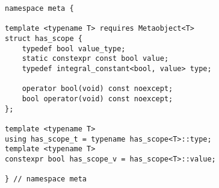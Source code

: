 
\begin{verbatim}
namespace meta {

template <typename T> requires Metaobject<T>
struct has_scope {
	typedef bool value_type;
	static constexpr const bool value;
	typedef integral_constant<bool, value> type;

	operator bool(void) const noexcept;
	bool operator(void) const noexcept;
};

template <typename T>
using has_scope_t = typename has_scope<T>::type;
template <typename T>
constexpr bool has_scope_v = has_scope<T>::value;

} // namespace meta
\end{verbatim}
